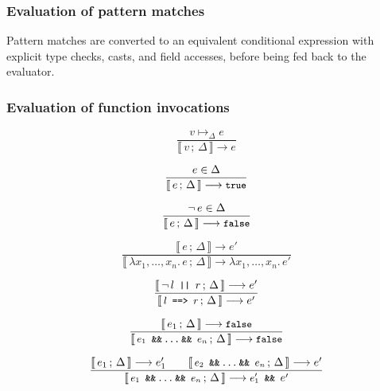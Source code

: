 \documentclass[a4paper,twoside]{article}
\newcommand{\lb}[2]{\llbracket\, #1\,;\, #2\, \rrbracket}
\newcommand{\stt}[1]{\texttt{\small{#1}}}
\begin{document}
\subsubsection*{Evaluation of pattern matches}

Pattern matches are converted to an equivalent conditional expression with explicit type checks, casts, and field accesses, before being fed back to the evaluator.

\subsubsection*{Evaluation of function invocations}



\begin{figure}[htb]
\begin{framed}

\begin{equation}
\dfrac{
  v \mapsto_\Delta e
}{
  \lb{v}{\Delta} \longrightarrow e
}
\end{equation}
 
\begin{equation}
\dfrac{
  e \in \Delta
}{
  \lb{e}{\Delta} \longrightarrow \stt{true}
}
\end{equation}

\begin{equation}
\dfrac{
  \neg\, e \in \Delta
}{
  \lb{e}{\Delta} \longrightarrow \stt{false}
}
\end{equation}

\begin{equation}
\dfrac{
  \lb{e}{\Delta} \longrightarrow e'
}{
  \lb{\lambda x_1, \ldots, x_n.\, e}{\Delta} \longrightarrow \lambda x_1, \ldots, x_n.\, e'
}
\end{equation}

\begin{equation}
\dfrac{
  \lb{\neg\,l \stt{ || } r}{\Delta} \longrightarrow e'
}{
  \lb{\stt{$l$ ==> $r$}}{\Delta} \longrightarrow e'
}
\end{equation}

\begin{equation}
\dfrac{
  \lb{e_1}{\Delta} \longrightarrow \stt{false}
}{
  \lb{\stt{$e_1$ \&\&\,\ldots\,\&\& $e_n$}}{\Delta} \longrightarrow \stt{false}
}
\end{equation}

\begin{equation}
\dfrac{
  \lb{e_1}{\Delta} \longrightarrow e_1' \qquad
  \lb{\stt{$e_2$ \&\&\,\ldots\,\&\& $e_n$}}{\Delta} \longrightarrow e'
}{
  \lb{\stt{$e_1$ \&\&\,\ldots\,\&\& $e_n$}}{\Delta} \longrightarrow \stt{$e_1'$ \&\& } e' 
}
\end{equation}


\end{framed}
\end{figure}
\end{document}
